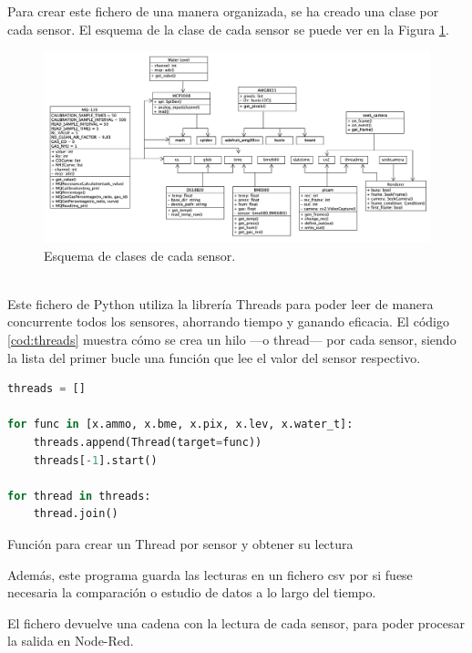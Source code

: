 Para crear este fichero de una manera organizada, se ha creado una clase por cada sensor. El esquema de la clase de cada sensor se puede ver en la Figura \ref{fig:umlet}. 
\begin{figure} [h!]
  \begin{center}
    \includegraphics[width=16cm]{figs/umlet}
  \end{center}
  \caption{Esquema de clases de cada sensor.}
  \label{fig:umlet}
\end{figure}\\

Este fichero de Python utiliza la librería Threads para poder leer de manera concurrente todos los sensores, ahorrando tiempo y ganando eficacia. El código \ref{cod:threads} muestra cómo se crea un hilo ---o thread--- por cada sensor, siendo la lista del primer bucle una función que lee el valor del sensor respectivo.
\begin{code}[h]
\begin{lstlisting}[language=Python]
threads = []

for func in [x.ammo, x.bme, x.pix, x.lev, x.water_t]:
	threads.append(Thread(target=func))
	threads[-1].start()
	
for thread in threads:
	thread.join()
\end{lstlisting}
\caption[Función para crear un Thread por sensor y obtener su lectura]{Función para crear un Thread por sensor y obtener su lectura}
\label{cod:threads}
\end{code}

Además, este programa guarda las lecturas en un fichero csv por si fuese necesaria la comparación o estudio de datos a lo largo del tiempo. 

El fichero devuelve una cadena con la lectura de cada sensor, para poder procesar la salida en Node-Red.\\

